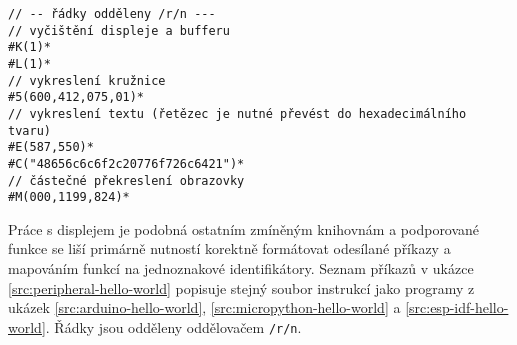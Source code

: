 \begin{lstlisting}[label=src:peripheral-hello-world,caption={Ilustrační použití režimu periferie}]
// -- řádky odděleny /r/n ---
// vyčištění displeje a bufferu
#K(1)*
#L(1)*
// vykreslení kružnice
#5(600,412,075,01)*
// vykreslení textu (řetězec je nutné převést do hexadecimálního tvaru)
#E(587,550)*
#C("48656c6c6f2c20776f726c6421")*
// částečné překreslení obrazovky
#M(000,1199,824)*
\end{lstlisting}

Práce s displejem je podobná ostatním zmíněným knihovnám a podporované funkce se liší primárně nutností korektně formátovat odesílané příkazy a mapováním funkcí na jednoznakové identifikátory\cite{solderedelectronicsInkplatePeripheralMode}. Seznam příkazů v ukázce \ref{src:peripheral-hello-world} popisuje stejný soubor instrukcí jako programy z ukázek \ref{src:arduino-hello-world}, \ref{src:micropython-hello-world} a \ref{src:esp-idf-hello-world}. Řádky jsou odděleny oddělovačem \lstinline|/r/n|.